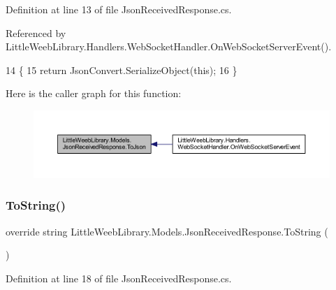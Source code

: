 Definition at line 13 of file Json\+Received\+Response.\+cs.



Referenced by Little\+Weeb\+Library.\+Handlers.\+Web\+Socket\+Handler.\+On\+Web\+Socket\+Server\+Event().


\begin{DoxyCode}
14         \{
15             \textcolor{keywordflow}{return} JsonConvert.SerializeObject(\textcolor{keyword}{this});
16         \}
\end{DoxyCode}
Here is the caller graph for this function\+:\nopagebreak
\begin{figure}[H]
\begin{center}
\leavevmode
\includegraphics[width=350pt]{class_little_weeb_library_1_1_models_1_1_json_received_response_abed77a236608efb9bf777a44e6d2361b_icgraph}
\end{center}
\end{figure}
\mbox{\label{class_little_weeb_library_1_1_models_1_1_json_received_response_a396aa50a773bcd751e23cc7d61db34be}} 
\subsubsection{\texorpdfstring{To\+String()}{ToString()}}
{\footnotesize\ttfamily override string Little\+Weeb\+Library.\+Models.\+Json\+Received\+Response.\+To\+String (\begin{DoxyParamCaption}{ }\end{DoxyParamCaption})}



Definition at line 18 of file Json\+Received\+Response.\+cs.


